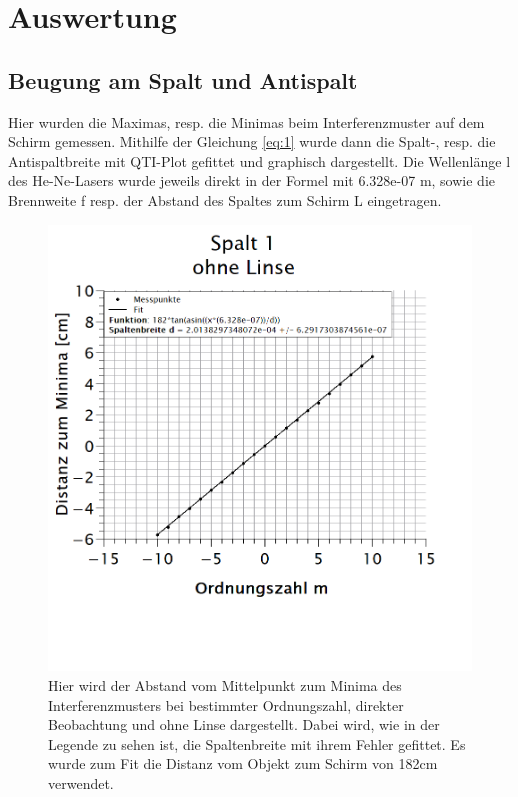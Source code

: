\chapter{Auswertung}
\thispagestyle{fancy}
\section{Beugung am Spalt und Antispalt}
Hier wurden die Maximas, resp. die Minimas beim Interferenzmuster auf dem Schirm gemessen. Mithilfe der Gleichung \ref{eq:1} wurde dann die Spalt-, resp. die Antispaltbreite mit QTI-Plot gefittet und graphisch dargestellt. Die Wellenlänge l des He-Ne-Lasers wurde jeweils direkt in der Formel mit 6.328e-07 m, sowie die Brennweite f resp. der Abstand des Spaltes zum Schirm L eingetragen.\\
\vspace{-0.5cm}
\begin{figure}[h]
\centering
\includegraphics[width=\textwidth]{Bilder/spalt1_ohneLinse.png}
\vspace*{-3.5cm}
\caption[Spalt 1: ohne Linse]{Hier wird der Abstand vom Mittelpunkt zum Minima des Interferenzmusters bei bestimmter Ordnungszahl, direkter Beobachtung und ohne Linse dargestellt. Dabei wird, wie in der Legende zu sehen ist, die Spaltenbreite mit ihrem Fehler gefittet. Es wurde zum Fit die Distanz vom Objekt zum Schirm von 182cm verwendet.}
\label{fig:spalt1_ohneLinse}
\end{figure}
